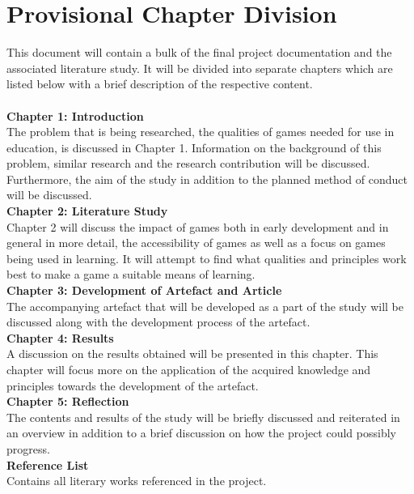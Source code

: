 \section{Provisional Chapter Division}
This document will contain a bulk of the final project documentation and the associated literature study. It will be divided into separate chapters which are listed below with a brief description of the respective content.
\\\\
\indent \textbf{Chapter 1: Introduction} \\	
The problem that is being researched, the qualities of games needed for use in education, is discussed in Chapter 1. Information on the background of this problem, similar research and the research contribution will be discussed. Furthermore, the aim of the study in addition to the planned method of conduct will be discussed.
\\
\indent \textbf{Chapter 2: Literature Study} \\
Chapter 2 will discuss the impact of games both in early development and in general in more detail, the accessibility of games as well as a focus on games being used in learning. It will attempt to find what qualities and principles work best to make a game a suitable means of learning.
\\
\indent \textbf{Chapter 3: Development of Artefact and Article} \\
The accompanying artefact that will be developed as a part of the study will be discussed along with the development process of the artefact.
\\
\indent \textbf{Chapter 4: Results} \\
A discussion on the results obtained will be presented in this chapter. This chapter will focus more on the application of the acquired knowledge and principles towards the development of the artefact.
\\
\indent \textbf{Chapter 5: Reflection} \\
The contents and results of the study will be briefly discussed and reiterated in an overview in addition to a brief discussion on how the project could possibly progress.
\\
\indent \textbf{Reference List} \\
Contains all literary works referenced in the project.

